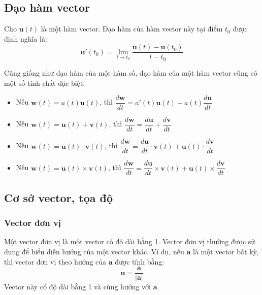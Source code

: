 \subsection{Đạo hàm vector}
\begin{definition}
    Cho \(\mathbf{u}(t)\) là một hàm vector. Đạo hàm của hàm vector này tại điểm \(t_0\) được định nghĩa là:
    \begin{equation}
        \mathbf{u}'(t_0) = \lim_{t \to t_0} \frac{\mathbf{u}(t) - \mathbf{u}(t_0)}{t - t_0}
    \end{equation}
\end{definition}
Cũng giống như đạo hàm của một hàm số, đạo hàm của một hàm vector cũng có một số tính chất đặc biệt:
\begin{itemize}
\item Nếu \(\mathbf{w}(t)=a(t)\mathbf{u}(t)\), thì \(\dfrac{d\mathbf{w}}{dt} = a'(t)\mathbf{u}(t) + a(t)\dfrac{d\mathbf{u}}{dt}\)
\item Nếu \(\mathbf{w}(t)=\mathbf{u}(t) + \mathbf{v}(t)\), thì \(\dfrac{d\mathbf{w}}{dt} = \dfrac{d\mathbf{u}}{dt} + \dfrac{d\mathbf{v}}{dt}\)
\item Nếu \(\mathbf{w}(t)=\mathbf{u}(t) \cdot \mathbf{v}(t)\), thì \(\dfrac{d\mathbf{w}}{dt} = \dfrac{d\mathbf{u}}{dt} \cdot \mathbf{v}(t) + \mathbf{u}(t) \cdot \dfrac{d\mathbf{v}}{dt}\)
\item Nếu \(\mathbf{w}(t)=\mathbf{u}(t) \times \mathbf{v}(t)\), thì \(\dfrac{d\mathbf{w}}{dt} = \dfrac{d\mathbf{u}}{dt} \times \mathbf{v}(t) + \mathbf{u}(t) \times \dfrac{d\mathbf{v}}{dt}\)
\end{itemize}

\subsection{Cơ sở vector, tọa độ}
\subsubsection{Vector đơn vị}
Một vector đơn vị là một vector có độ dài bằng 1. Vector đơn vị thường được sử dụng để biểu diễn hướng của một vector khác. Ví dụ, nếu \(\mathbf{a}\) là một vector bất kỳ, thì vector đơn vị theo hướng của \(\mathbf{a}\) được tính bằng:
\begin{equation}
    \mathbf{u} = \frac{\mathbf{a}}{|\mathbf{a}|} 
\end{equation}
Vector này có độ dài bằng 1 và cùng hướng với \(\mathbf{a}\).
